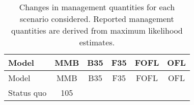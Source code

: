 \documentclass[]{article}
\begin{document}
\begin{longtable}[]{@{}lccccc@{}}
\caption{\label{stepchange}Changes in management quantities for each
scenario considered. Reported management quantities are derived from
maximum likelihood estimates.}\tabularnewline
\toprule
\begin{minipage}[b]{0.17\columnwidth}\raggedright\strut
Model\strut
\end{minipage} & \begin{minipage}[b]{0.09\columnwidth}\centering\strut
MMB\strut
\end{minipage} & \begin{minipage}[b]{0.09\columnwidth}\centering\strut
B35\strut
\end{minipage} & \begin{minipage}[b]{0.09\columnwidth}\centering\strut
F35\strut
\end{minipage} & \begin{minipage}[b]{0.09\columnwidth}\centering\strut
FOFL\strut
\end{minipage} & \begin{minipage}[b]{0.09\columnwidth}\centering\strut
OFL\strut
\end{minipage}\tabularnewline
\midrule
\endfirsthead
\toprule
\begin{minipage}[b]{0.17\columnwidth}\raggedright\strut
Model\strut
\end{minipage} & \begin{minipage}[b]{0.09\columnwidth}\centering\strut
MMB\strut
\end{minipage} & \begin{minipage}[b]{0.09\columnwidth}\centering\strut
B35\strut
\end{minipage} & \begin{minipage}[b]{0.09\columnwidth}\centering\strut
F35\strut
\end{minipage} & \begin{minipage}[b]{0.09\columnwidth}\centering\strut
FOFL\strut
\end{minipage} & \begin{minipage}[b]{0.09\columnwidth}\centering\strut
OFL\strut
\end{minipage}\tabularnewline
\midrule
\endhead
\begin{minipage}[t]{0.17\columnwidth}\raggedright\strut
Status quo\strut
\end{minipage} & \begin{minipage}[t]{0.09\columnwidth}\centering\strut
105\strut
\end{minipage} & \begin{minipage}[t]{0.09\columnwidth}\centering\strut

\end{minipage}
\end{longtable}
\end{document}
